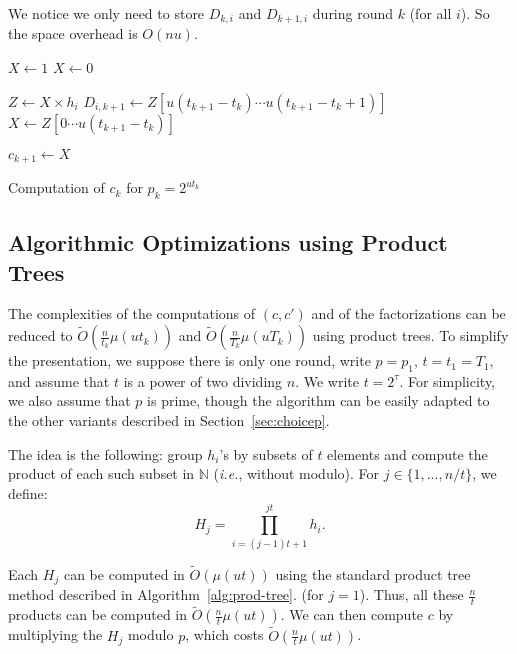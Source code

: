 \documentclass{llncs}
\newcommand{\Oapp}{\ensuremath{\tilde{O}}}
\newcommand{\ie}{\textit{i.e.}\xspace}
\begin{document}
We notice we only need to store $D_{k,i}$ and $D_{k+1,i}$ during round $k$ (for all $i$).
So the space overhead is $O(nu)$.


\begin{algorithm}
\newcommand{\vstart}{\ensuremath{\mathrm{start}}}
\newcommand{\vmid}{\ensuremath{\mathrm{mid}}}
\newcommand{\vend}{\ensuremath{\mathrm{end}}}
\begin{algorithmic}[1]

  \State $X \gets 1$
\Else
  \State $X \gets 0$
\EndIf

  \State $Z \gets X \times h_i$
  \State $D_{i,k+1} \gets Z[u(t_{k+1}-t_k)\cdots u(t_{k+1}-t_k+1)]$
  \State $X \gets Z[0\cdots u(t_{k+1}-t_k)]$
\EndFor

\State $c_{k+1} \gets X$
\end{algorithmic}
\caption{Computation of $c_k$ for $p_k = 2^{ut_k}$}
\label{alg:even-p-c}
\end{algorithm}

\subsection{Algorithmic Optimizations using Product Trees}
\label{sec:algo-opt-prod-trees}

The complexities of the computations of $(c,c')$ and of the factorizations can be reduced to $\Oapp(\frac{n}{t_k} \mu(u t_k))$ and $\Oapp(\frac{n}{T_k} \mu(u T_k))$ using product trees. 
To simplify the presentation, we suppose there is only one round, write $p=p_1$, $t=t_1=T_1$, and assume that $t$ is a power of two dividing $n$. We write $t = 2^\tau$.
For simplicity, we also assume that $p$ is prime, though the algorithm can be easily adapted to the other variants described in Section~\ref{sec:choicep}.

The idea is the following: group $h_i$'s by subsets of $t$ elements and compute the product of each such subset in $\mathbb{N}$ (\ie, without modulo). For $j \in \{1,\dots,n/t\}$, we define:
\[ H_j = \prod_{i=(j-1) t + 1}^{j t} h_i. \]

Each $H_j$ can be computed in $\Oapp(\mu(u t))$ using the standard product tree method described in Algorithm~\ref{alg:prod-tree}. (for $j=1$).
Thus, all these $\frac{n}{t}$ products can be computed in $\Oapp(\frac{n}{t} \mu(u t))$. We can then compute $c$ by multiplying the $H_j$ modulo $p$, which costs $\Oapp(\frac{n}{t} \mu(u t))$.
\end{document}
